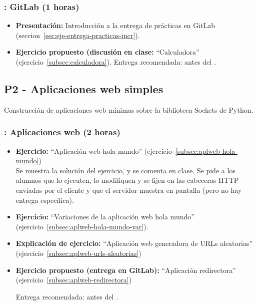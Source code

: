 \documentclass[a4paper,12pt]{article}
\begin{document}
\subsubsection{\juevesD: GitLab (1 horas)}
\label{cal:juevesDa}

\begin{itemize}
\item \textbf{Presentación:} Introducción a la entrega de prácticas en GitLab (seccion~\ref{sec:eje-entrega-practicas-incr}).

\item \textbf{Ejercicio propuesto (discusión en clase:} ``Calculadora'' (ejercicio~\ref{subsec:calculadora}).
   Entrega recomendada: antes del \juevesE.
\end{itemize}


\subsection{P2 - Aplicaciones web simples}


Construcción de aplicaciones web mínimas sobre la biblioteca Sockets de Python.


\subsubsection{\juevesE: Aplicaciones web (2 horas)}
\label{cal:juevesE}

\begin{itemize}
 \item \textbf{Ejercicio:} ``Aplicación web hola mundo'' (ejercicio~\ref{subsec:aplweb-hola-mundo}) \\
   Se muestra la solución del ejercicio, y se comenta en clase. Se pide a los alumnos que lo ejecuten, lo modifiquen y se fijen en las cabeceras HTTP enviadas por el cliente y que el servidor muestra en pantalla (pero no hay entrega específica).
 \item \textbf{Ejercicio:} ``Variaciones de la aplicación web hola mundo'' (ejercicio~\ref{subsec:aplweb-hola-mundo-var}).
\item \textbf{Explicación de ejercicio:} ``Aplicación web generadora de URLs aleatorias'' (ejercicio~\ref{subsec:aplweb-urls-aleatorias})
\item \textbf{Ejercicio propuesto (entrega en GitLab):} ``Aplicación redirectora'' (ejercicio~\ref{subsec:aplweb-redirectora})


   Entrega recomendada: antes del \juevesF.
\end{itemize}
\end{document}
